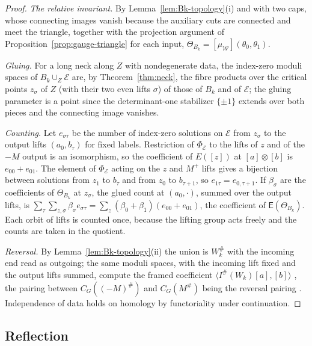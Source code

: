 \documentclass[11pt]{amsart}
\theoremstyle{definition}
\theoremstyle{remark}
\theoremstyle{plain}
\numberwithin{equation}{section}
\newcommand{\Ish}{I^{\#}}
\begin{document}
\begin{proof}
\emph{The relative invariant.} By Lemma~\ref{lem:Bk-topology}(i) and
\cite[Proposition~5.4]{KM-unknot} with two caps, whose connecting images vanish
because the auxiliary cuts are connected and meet the triangle, together with the
projection argument of Proposition~\ref{prop:gauge-triangle} for each input,
$\Theta_{B_k}=[\mu_{\mathscr W}](\theta_0,\theta_1)$.

\emph{Gluing.} For a long neck along $Z$ with nondegenerate data, the index-zero
moduli spaces of $B_k\cup_Z\mathcal E$ are, by Theorem~\ref{thm:neck}, the fibre
products over the critical points $z_\sigma$ of $Z$ (with their two even lifts
$\sigma$) of those of $B_k$ and of $\mathcal E$; the gluing parameter is a point since the
determinant-one stabilizer $\{\pm1\}$ extends over both pieces and the connecting
image vanishes.

\emph{Counting.} Let $e_{\sigma\tau}$ be the number of index-zero solutions on $\mathcal E$
from $z_\sigma$ to the output lifts $(a_0,b_\tau)$ for fixed labels. Restriction of
$\Phi_{\mathcal E}$ to the lifts of $z$ and of the $-M$ output is an isomorphism, so the
coefficient of $E([z])$ at $[a]\otimes[b]$ is $e_{00}+e_{01}$. The element of
$\Phi_{\mathcal E}$ acting on the $z$ and $M^+$ lifts gives a bijection between
solutions from $z_1$ to $b_\tau$ and from $z_0$ to $b_{\tau+1}$, so
$e_{1\tau}=e_{0,\tau+1}$. If $\beta_\sigma$ are the coefficients of $\Theta_{B_k}$ at $z_\sigma$,
the glued count at $(a_0,\cdot)$, summed over the output lifts, is
$\sum_\tau\sum_{z,\sigma}\beta_\sigma e_{\sigma\tau}=\sum_z(\beta_0+\beta_1)(e_{00}+e_{01})$, the coefficient of $\mathsf E(\Theta_{B_k})$. Each orbit of lifts is counted once, because the lifting group acts freely and the counts are taken in the quotient.

\emph{Reversal.} By Lemma~\ref{lem:Bk-topology}(ii) the union is $W_k^\#$ with the
incoming end read as outgoing; the same moduli spaces, with the incoming lift
fixed and the output lifts summed, compute the framed coefficient
$\langle\Ish(W_k)[a],[b]\rangle$ \cite[Section~7.2]{Scaduto}, the pairing between
$C_G((-M)^\#)$ and $C_G(M^\#)$ being the reversal pairing
\cite[Section~7.4]{Scaduto}. Independence of data holds on homology by
functoriality under continuation.
\end{proof}

\subsection{Reflection}\label{subsec:reflection}
\end{document}
